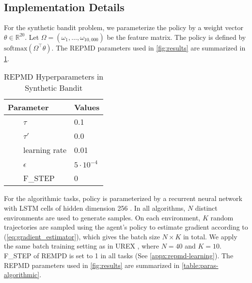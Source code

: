 \subsection{Implementation Details}
\label{subsec:implementation}
For the synthetic bandit problem, we parameterize the policy by a weight vector $\theta\in  \mathbb{R}^{20}$. Let $\Omega = \left( \omega_1, \dots, \omega_{10,000} \right)$ be the feature matrix. The policy is defined by $\text{softmax}(\Omega^{\top}\theta)$. The REPMD parameters used in \cref{fig:results} are summarized in \cref{table:paras-bandit}. 
\begin{table}[ht]
\caption{REPMD Hyperparameters in Synthetic Bandit} %
\centering 
\begin{tabular}{l l} 
\hline
Parameter & Values \\ [0.5ex] %
\hline %
\ \ \ \ $\tau$ & 0.1  \\
\ \ \ \ $\tau'$ & 0.0 \\
\ \ \ \ learning rate & 0.01 \\
\ \ \ \ $\epsilon $ & $5\cdot 10^{-4}$ \\
\ \ \ \ F\_STEP & 0 \\
\hline
\end{tabular}
\label{table:paras-bandit} %
\end{table}


For the algorithmic tasks, policy is parameterized by a recurrent neural network with LSTM cells of hidden dimension 256 \citep{hochreiter1997long}. In all algorithms, $N$ distinct environments are used to generate samples. On each environment, $K$ random trajectories are sampled using the agent's policy to estimate gradient according to (\ref{eq:gradient_estimator}), which gives the batch size $N\times K$ in total. We apply the same batch training setting as in UREX \citep{nachum2017improving}, where $N=40$ and $K=10$. F\_STEP of REMPD is set to 1 in all tasks (See \cref{appx:repmd-learning}). The REPMD parameters used in \cref{fig:results} are summarized in \cref{table:paras-algorithmic}. 

